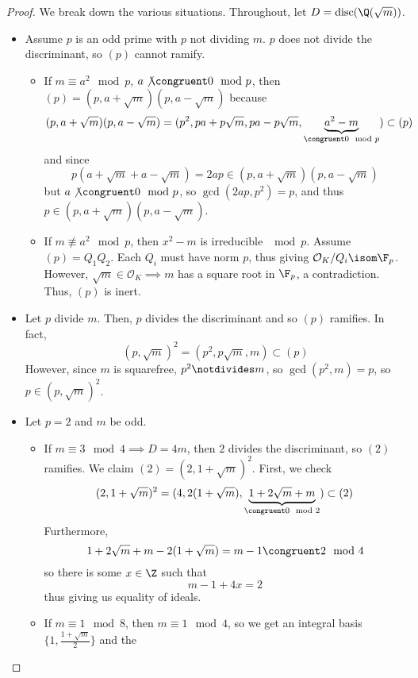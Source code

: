 \documentclass[11pt,leqno,oneside]{amsart}
\numberwithin{thm}{section}
\renewcommand{\O}{\mathcal{O}}
\newcommand{\disc}{\operatorname{disc}}
\begin{document}
\begin{proof}
  We break down the various situations. Throughout, let \(D =
  \disc(\Q(\sqrt{m}))\). 
  \begin{itemize}
  \item Assume \(p\) is an odd prime with \(p\) not dividing
    \(m\). \(p\) does not divide the discriminant, so \((p)\) cannot
      ramify.
    \begin{itemize}
    \item If \(m \equiv a^2 \mod p\), \(a \not \congruent 0 \mod p\),
      then \((p) = 
      (p,a+\sqrt{m})(p,a-\sqrt{m})\) because \[
        (p,a+\sqrt{m})(p,a-\sqrt{m}) = (p^2,
        pa+p\sqrt{m},pa-p\sqrt{m},\underbrace{a^2-m}_{\congruent 0
          \mod p}) \subset (p)
      \]
      and since \[
        p(a+\sqrt{m}+a-\sqrt{m}) = 2ap \in (p,a+\sqrt{m})(p,a-\sqrt{m})
      \]
      but \(a \not\congruent 0 \mod p\), so \(\gcd(2ap, p^2) = p\),
      and thus \(p \in (p,a+\sqrt{m})(p,a-\sqrt{m})\).
    \item If \(m \not \equiv a^2 \mod p\), then \(x^2-m\) is irreducible
      \(\mod p\). Assume \((p) = Q_1Q_2\). Each \(Q_i\) must have norm
      \(p\), thus giving \(\O_K/Q_i \isom \F_p\). However, \(\sqrt{m} \in
      \O_K \implies m\) has a square root in \(\F_p\), a
      contradiction. Thus, \((p)\) is inert.
    \end{itemize}
  \item Let \(p\) divide \(m\). Then, \(p\) divides the discriminant
    and so \((p)\) ramifies. In fact, \[
      (p,\sqrt{m})^2 = (p^2, p\sqrt{m},m) \subset (p)
    \]
    However, since \(m\) is squarefree, \(p^2 \notdivides m\), so
    \(\gcd(p^2,m) = p\), so \(p \in (p,\sqrt{m})^2\).
  \item Let \(p=2\) and \(m\) be odd.
  \begin{itemize}
    \item If \(m \equiv 3 \mod 4 
      \implies D=4m\), then \(2\) divides the 
      discriminant, so \((2)\) ramifies. We claim \((2) =
      (2,1+\sqrt{m})^2\). First, we check \[
        (2,1+\sqrt{m})^2 =
        (4,2(1+\sqrt{m}),\underbrace{1+2\sqrt{m}+m}_{\congruent 0 \mod
        2}) \subset (2)
    \]
    Furthermore, \[
      1+2\sqrt{m}+m-2(1+\sqrt{m}) = m-1 \congruent 2 \mod 4
    \]
    so there is some \(x \in \Z\) such that \[
      m-1+4x = 2
    \]
    thus giving us equality of ideals.
    \item If \(m \equiv 1 \mod 8\), then \(m
      \equiv 1 \mod 4\), so we get 
      an integral basis \(\{1, \frac{1+\sqrt{m}}{2}\}\) and the

\end{itemize}
\end{itemize}
\end{proof}
\end{document}
